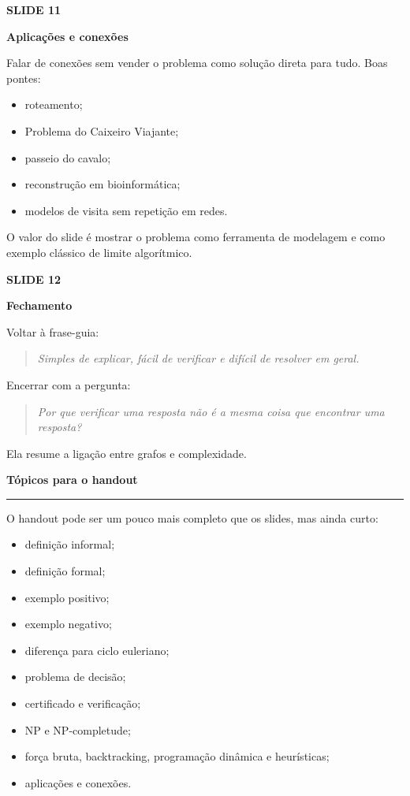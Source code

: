 \documentclass[11pt,a4paper]{article}
\newcommand{\sectiontitle}[1]{%
  \vspace{1.2em}
  {\Large\bfseries\color{accent}#1}\par
  \vspace{-0.35em}
  {\color{linegray}\rule{\linewidth}{0.5pt}}\par
  \vspace{0.25em}
}
\newcommand{\slide}[2]{%
  \vspace{0.9em}
  {\small\bfseries\color{muted}SLIDE #1}\par
  {\large\bfseries #2}\par
  \vspace{-0.3em}
}
\newcommand{\question}[1]{%
  \begin{quote}
    \itshape #1
  \end{quote}
}
\begin{document}
\slide{11}{Aplicações e conexões}

Falar de conexões sem vender o problema como solução direta para tudo. Boas pontes:

\begin{itemize}
  \item roteamento;
  \item Problema do Caixeiro Viajante;
  \item passeio do cavalo;
  \item reconstrução em bioinformática;
  \item modelos de visita sem repetição em redes.
\end{itemize}

O valor do slide é mostrar o problema como ferramenta de modelagem e como exemplo clássico de limite algorítmico.

\slide{12}{Fechamento}

Voltar à frase-guia:

\question{Simples de explicar, fácil de verificar e difícil de resolver em geral.}

Encerrar com a pergunta:

\question{Por que verificar uma resposta não é a mesma coisa que encontrar uma resposta?}

Ela resume a ligação entre grafos e complexidade.

\sectiontitle{Tópicos para o handout}

O handout pode ser um pouco mais completo que os slides, mas ainda curto:

\begin{itemize}
  \item definição informal;
  \item definição formal;
  \item exemplo positivo;
  \item exemplo negativo;
  \item diferença para ciclo euleriano;
  \item problema de decisão;
  \item certificado e verificação;
  \item NP e NP-completude;
  \item força bruta, backtracking, programação dinâmica e heurísticas;
  \item aplicações e conexões.
\end{itemize}
\end{document}
